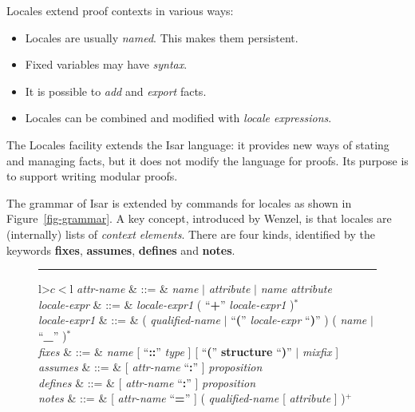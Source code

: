 \begin{isabellebody}
\begin{isamarkuptext}
  Locales extend proof contexts in various ways:
  \begin{itemize}
  \item
    Locales are usually \emph{named}.  This makes them persistent.
  \item
    Fixed variables may have \emph{syntax}.
  \item
    It is possible to \emph{add} and \emph{export} facts.
  \item
    Locales can be combined and modified with \emph{locale
    expressions}.
  \end{itemize}
  The Locales facility extends the Isar language: it provides new ways
  of stating and managing facts, but it does not modify the language
  for proofs.  Its purpose is to support writing modular proofs.%
\end{isamarkuptext}%
\isamarkuptrue%
%
\isamarkuptrue%
%
\isamarkuptrue%
%
\begin{isamarkuptext}%
The grammar of Isar is extended by commands for locales as shown in
  Figure~\ref{fig-grammar}.
  A key concept, introduced by Wenzel, is that
  locales are (internally) lists
  of \emph{context elements}.  There are four kinds, identified
  by the keywords \textbf{fixes}, \textbf{assumes}, \textbf{defines} and
  \textbf{notes}.

  \begin{figure}
  \hrule
  \vspace{2ex}
  \begin{small}
  \begin{tabular}{l>$c<$l}
  \textit{attr-name} & ::=
  & \textit{name} $|$ \textit{attribute} $|$
    \textit{name} \textit{attribute} \\

  \textit{locale-expr}  & ::= 
  & \textit{locale-expr1} ( ``\textbf{+}'' \textit{locale-expr1} )$^*$ \\
  \textit{locale-expr1} & ::=
  & ( \textit{qualified-name} $|$
    ``\textbf{(}'' \textit{locale-expr} ``\textbf{)}'' )
    ( \textit{name} $|$ ``\textbf{\_}'' )$^*$ \\

  \textit{fixes} & ::=
  & \textit{name} [ ``\textbf{::}'' \textit{type} ]
    [ ``\textbf{(}'' \textbf{structure} ``\textbf{)}'' $|$
    \textit{mixfix} ] \\
  \textit{assumes} & ::=
  & [ \textit{attr-name} ``\textbf{:}'' ] \textit{proposition} \\
  \textit{defines} & ::=
  & [ \textit{attr-name} ``\textbf{:}'' ] \textit{proposition} \\
  \textit{notes} & ::=
  & [ \textit{attr-name} ``\textbf{=}'' ]
    ( \textit{qualified-name} [ \textit{attribute} ] )$^+$ \\


\end{tabular}
\end{small}
\end{figure}
\end{isamarkuptext}
\end{isabellebody}

